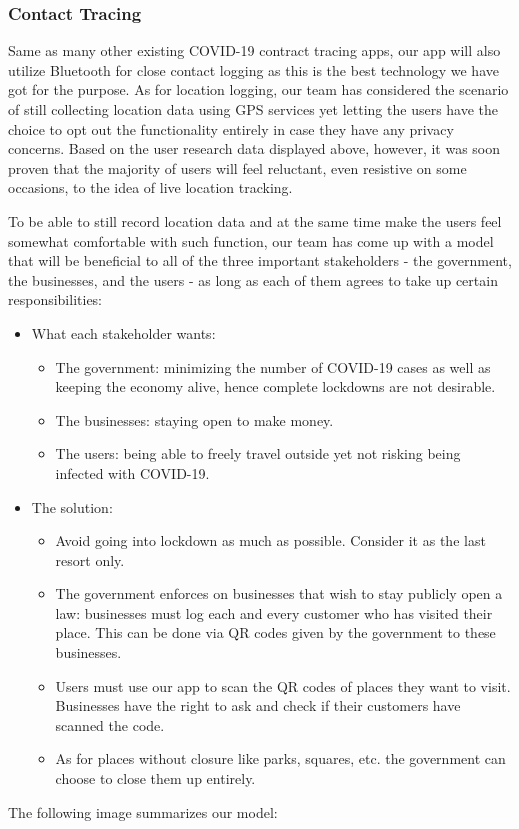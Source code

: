   \subsubsection{Contact Tracing}
  \par Same as many other existing COVID-19 contract tracing apps, our app will also utilize Bluetooth for close contact logging as this is the best technology we have got for the purpose. As for location logging, our team has considered the scenario of still collecting location data using GPS services yet letting the users have the choice to opt out the functionality entirely in case they have any privacy concerns. Based on the user research data displayed above, however, it was soon proven that the majority of users will feel reluctant, even resistive on some occasions, to the idea of live location tracking.
  \par To be able to still record location data and at the same time make the users feel somewhat comfortable with such function, our team has come up with a model that will be beneficial to all of the three important stakeholders - the government, the businesses, and the users - as long as each of them agrees to take up certain responsibilities:
  \begin{itemize}
    \item What each stakeholder wants:
      \begin{itemize}
        \item The government: minimizing the number of COVID-19 cases as well as keeping the economy alive, hence complete lockdowns are not desirable.
        \item The businesses: staying open to make money.
        \item The users: being able to freely travel outside yet not risking being infected with COVID-19.
      \end{itemize}
    \item The solution:
      \begin{itemize}
        \item Avoid going into lockdown as much as possible. Consider it as the last resort only.
        \item The government enforces on businesses that wish to stay publicly open a law: businesses must log each and every customer who has visited their place. This can be done via QR codes given by the government to these businesses.
        \item Users must use our app to scan the QR codes of places they want to visit. Businesses have the right to ask and check if their customers have scanned the code.
        \item As for places without closure like parks, squares, etc. the government can choose to close them up entirely.
      \end{itemize}
  \end{itemize}
  \par The following image summarizes our model:

